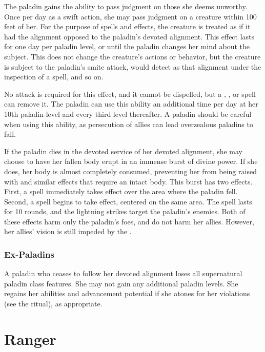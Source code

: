 The paladin gains the ability to pass judgment on those she deems unworthy.
Once per day as a swift action, she may pass judgment on a creature within 100 feet of her.
For the purpose of spells and effects, the creature is treated as if it had the alignment opposed to the paladin's devoted alignment.
This effect lasts for one day per paladin level, or until the paladin changes her mind about the subject.
This does not change the creature's actions or behavior, but the creature is subject to the paladin's smite attack, would detect as that alignment under the inspection of a  spell, and so on.

No attack is required for this effect, and it cannot be dispelled, but a , , or  spell can remove it.
The paladin can use this ability an additional time per day at her 10th paladin level and every third level thereafter.
A paladin should be careful when using this ability, as persecution of allies can lead overzealous paladins to fall.

If the paladin dies in the devoted service of her devoted alignment, she may choose to have her fallen body erupt in an immense burst of divine power.
If she does, her body is almost completely consumed, preventing her from being raised with  and similar effects that require an intact body.
This burst has two effects.
First, a  spell immediately takes effect over the area where the paladin fell.
Second, a  spell begins to take effect, centered on the same area.
The spell lasts for 10 rounds, and the lightning strikes target the paladin's enemies.
Both of these effects harm only the paladin's foes, and do not harm her allies.
However, her allies' vision is still impeded by the .

\subsubsection{Ex-Paladins}
A paladin who ceases to follow her devoted alignment loses all supernatural paladin class features.
She may not gain any additional paladin levels.
She regains her abilities and advancement potential if she atones for her violations (see the  ritual), as appropriate.

\section{Ranger}

